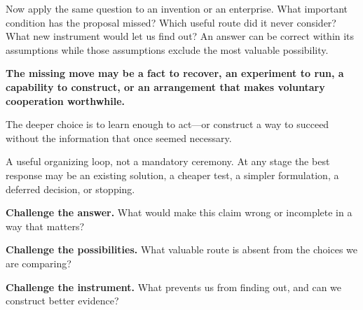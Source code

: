 \documentclass[11pt,letterpaper]{article}
\theoremstyle{remark}\newtheorem{remark}{Remark}[section]
\newcommand{\smallhead}[1]{\par\smallskip{\sffamily\bfseries\color{Gold}#1}\par\smallskip}
\begin{document}
Now apply the same question to an invention or an enterprise. What important condition has the proposal missed? Which useful route did it never consider? What new instrument would let us find out? An answer can be correct within its assumptions while those assumptions exclude the most valuable possibility.
\begin{seabox}
\textbf{The missing move may be a fact to recover, an experiment to run, a capability to construct, or an arrangement that makes voluntary cooperation worthwhile.}\par
The deeper choice is to learn enough to act---or construct a way to succeed without the information that once seemed necessary.
\end{seabox}
\begin{center}
\end{center}
{\small\color{Muted}A useful organizing loop, not a mandatory ceremony. At any stage the best response may be an existing solution, a cheaper test, a simpler formulation, a deferred decision, or stopping.}

\smallhead{THREE QUESTIONS THAT REACH BEYOND DEBATE}
\textbf{Challenge the answer.} What would make this claim wrong or incomplete in a way that matters?\par
\textbf{Challenge the possibilities.} What valuable route is absent from the choices we are comparing?\par
\textbf{Challenge the instrument.} What prevents us from finding out, and can we construct better evidence?
\end{document}
